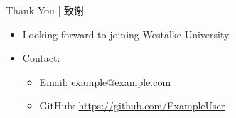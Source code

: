 \documentclass[11pt]{beamer}
\begin{document}
\begin{frame}{Thank You | 致谢}
\begin{itemize}
  \item Looking forward to joining Westalke University.
  \item Contact:
    \begin{itemize}
      \item Email: \href{mailto:example@example.com}{example@example.com}
      \item GitHub: \url{https://github.com/ExampleUser}
    \end{itemize}
\end{itemize}
\end{frame}
\end{document}
